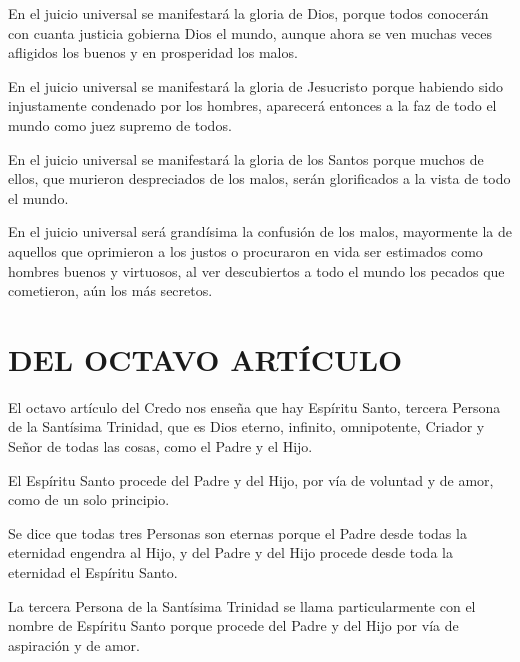 En el
juicio universal se manifestará la gloria de Dios, porque todos conocerán con
cuanta justicia gobierna Dios el mundo, aunque ahora se ven muchas veces
afligidos los buenos y en prosperidad los malos.

En el juicio universal se manifestará la gloria de Jesucristo porque habiendo sido
injustamente condenado por los hombres, aparecerá entonces a la faz de todo el
mundo como juez supremo de todos.

En el juicio universal se manifestará la gloria de los Santos porque muchos de
ellos, que murieron despreciados de los malos, serán glorificados a la vista de todo
el mundo.

 En el
juicio universal será grandísima la confusión de los malos, mayormente la de
aquellos que oprimieron a los justos o procuraron en vida ser estimados como
hombres buenos y virtuosos, al ver descubiertos a todo el mundo los pecados que
cometieron, aún los más secretos.

\section{DEL OCTAVO ARTÍCULO}

 El octavo artículo del Credo nos enseña que hay Espíritu Santo,
tercera Persona de la Santísima Trinidad, que es Dios eterno, infinito,
omnipotente, Criador y Señor de todas las cosas, como el Padre y el Hijo.

 El Espíritu Santo procede del
Padre y del Hijo, por vía de voluntad y de amor, como de un solo principio.

 Se dice que
todas tres Personas son eternas porque el Padre desde todas la eternidad engendra
al Hijo, y del Padre y del Hijo procede desde toda la eternidad el Espíritu Santo.

 La tercera Persona de la
Santísima Trinidad se llama particularmente con el nombre de Espíritu Santo
porque procede del Padre y del Hijo por vía de aspiración y de amor.


